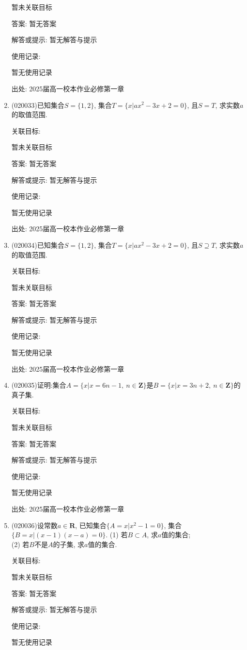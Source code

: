 \documentclass[10pt,a4paper]{article}
\begin{document}
\begin{enumerate}[1.]
暂未关联目标

答案: 暂无答案

解答或提示: 暂无解答与提示

使用记录:

暂无使用记录


出处: 2025届高一校本作业必修第一章
\item { (020033)}已知集合$S=\{1, 2\}$, 集合$T=\{x|ax^2-3x+2=0\}$, 且$S=T$, 求实数$a$的取值范围.


关联目标:

暂未关联目标

答案: 暂无答案

解答或提示: 暂无解答与提示

使用记录:

暂无使用记录


出处: 2025届高一校本作业必修第一章
\item { (020034)}已知集合$S=\{1, 2\}$, 集合$T=\{x|ax^2-3x+2=0\}$, 且$S\supseteq T$, 求实数$a$的取值范围.


关联目标:

暂未关联目标

答案: 暂无答案

解答或提示: 暂无解答与提示

使用记录:

暂无使用记录


出处: 2025届高一校本作业必修第一章
\item { (020035)}证明:集合$A=\{x|x=6n-1, \ n\in\mathbf{Z}\}$是$B=\{x|x=3n+2, \ n\in\mathbf{Z}\}$的真子集.


关联目标:

暂未关联目标

答案: 暂无答案

解答或提示: 暂无解答与提示

使用记录:

暂无使用记录


出处: 2025届高一校本作业必修第一章
\item { (020036)}设常数$a\in \mathbf{R}$, 已知集合$\{A=x|x^2-1=0\}$, 集合$\{B=x|(x-1)(x-a)=0\}$.
(1) 若$B\subset A$, 求$a$值的集合;\\
(2) 若$B$不是$A$的子集, 求$a$值的集合.


关联目标:

暂未关联目标

答案: 暂无答案

解答或提示: 暂无解答与提示

使用记录:

暂无使用记录



\end{enumerate}
\end{document}
